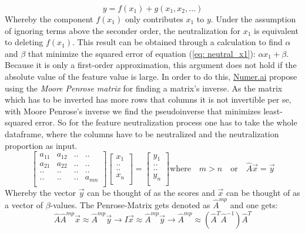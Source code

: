 \documentclass[12pt, a4paper]{article}
\begin{document}
\begin{equation}
\label{eq: neutral_x1}
    y = f(x_1) + g(x_1, x_2,...)
\end{equation}
Whereby the component $f(x_1)$ only contributes $x_1$ to $y$. Under the assumption of ignoring terms above the seconder order, the neutralization for $x_1$ is equivalent to deleting $f(x_1)$. This result can be obtained through a calculation to find $\alpha$ and $\beta$ that minimize the squared error of equation (\ref{eq: neutral_x1}): $\alpha x_1 + \beta$.
Because it is only a first-order approximation, this argument does not hold if the absolute value of the feature value is large.
In order to do this, \href{https://forum.numer.ai/t/an-introduction-to-feature-neutralization-exposure/4955}{Numer.ai} propose using the \textit{Moore Penrose matrix} for finding a matrix's inverse. As the matrix which has to be inverted has more rows that columns it is not invertible per se, with Moore Penrose's inverse we find the pseudoinverse that minimizes least-squared error. So for the feature neutralization process one has to take the whole dataframe, where the columns have to be neutralized and the neutralization proportion as input. 
\[  
\begin{bmatrix}  
a_{11} & a_{12} & .. & .. \\  
a_{21} & a_{22} & .. & .. \\  
.. & .. & .. & .. \\  
.. & .. & .. & a_{mn} \\  
\end{bmatrix}  
\begin{bmatrix}  
x_1 \\  
.. \\  
.. \\  
x_n \\  
\end{bmatrix}  
=
\begin{bmatrix}  
y_1 \\
.. \\  
.. \\  
y_n \\  
\end{bmatrix}  
\text{where} \quad m > n \quad \text{or} \quad \hat{A} \vec{x} = \vec{y} \]
Whereby the vector $\vec{y}$ can be thought of as the scores and $\vec{x}$ can be thought of as a vector of $\beta$-values. The Penrose-Matrix gets denoted as $\hat{A}^{mp}$ and one gets:
\begin{equation}
    \hat{A} \hat{A}^{mp} \vec{x} \approx \hat{A}^{mp} \vec{y} \rightarrow I \vec{x} \approx \hat{A}^{mp} \vec{y} \rightarrow \hat{A}^{mp} \approx (\hat{A}^T \hat{A}^{-1}) \hat{A}^T 
\end{equation}
\end{document}

